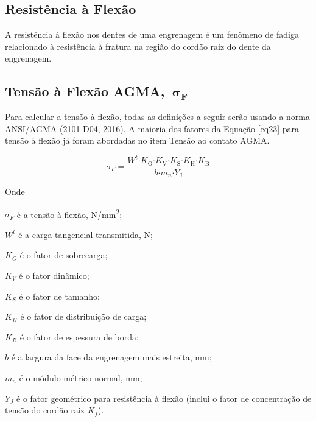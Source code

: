 \documentclass[12pt,a4paper]{article}
\begin{document}
\subsection*{Resistência à Flexão}

{\label{resistencia-uxe0-flexuxe3o}}

A resistência à flexão nos dentes de uma engrenagem é um fenômeno de
fadiga relacionado à resistência à fratura na região do cordão raiz do
dente da engrenagem.

\subsection*{Tensão à Flexão
AGMA,~\(\mathbf{\sigma}_{\mathbf{F}}\)}

{\label{tensuxe3o-uxe0-flexuxe3o-agma-mathbfsigma_mathbff}}

Para calcular a tensão à flexão, todas as definições a seguir serão
usando a norma ANSI/AGMA \hyperref[csl:5]{(2101-D04, 2016)}. A maioria dos fatores da
Equação {\ref{eq23}} para tensão à flexão já foram
abordadas no item Tensão ao contato AGMA.

\par\null

\begin{equation}
\label{eq23}
{\sigma }_F\mathrm{=}\frac{W^t\mathrm{\cdot }K_{\mathrm{O}}\mathrm{\cdot }K_{\mathrm{V}}\mathrm{\cdot }K_{\mathrm{S}}\mathrm{\cdot }K_{\mathrm{H}}\mathrm{\cdot }K_{\mathrm{B}}}{b\mathrm{\cdot }m_n\mathrm{\cdot }Y_{\mathrm{J}}}
\end{equation}



Onde

\(\sigma_{F}\) è a tensão à flexão, N/mm\textsuperscript{2};

\(W^{t}\) é a carga tangencial transmitida, N;

\(K_{O}\) é o fator de sobrecarga;

\(K_{V}\) é o fator dinâmico;

\(K_{S}\) é o fator de tamanho;

\(K_{H}\) é o fator de distribuição de carga;

\(K_{B}\) é o fator de espessura de borda;

\(b\) é a largura da face da engrenagem mais estreita, mm;

\(m_{n}\) é o módulo métrico normal, mm;

\(Y_{J}\) é o fator geométrico para resistência à flexão
(inclui o fator de concentração de tensão do cordão raiz
\(K_{f}\)).
\end{document}
